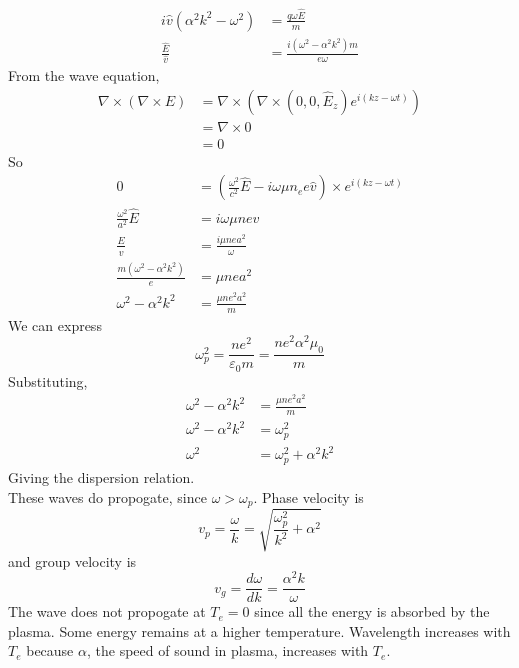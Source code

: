 \documentclass[answers]{exam}
\begin{document}
\begin{questions}
\begin{solution}
\begin{align*}
        i\hat v(\alpha^2k^2 - \omega^2) &= \frac{q\omega\hat E}{m} \\
        \frac{\hat E}{\hat v} &= \frac{i(\omega^2-\alpha^2k^2)m}{e\omega}
    \end{align*}
    From the wave equation,
    \begin{align*}
        \nabla \times (\nabla \times E) &= \nabla \times (\nabla \times (0, 0, \hat E_z) e^{i(kz-\omega t)}) \\
                                        &= \nabla \times 0 \\
                                        &= 0
    \end{align*}
    So
    \begin{align*}
        0 &= \left(\frac{\omega^2}{c^2} \hat E - i\omega \mu n_ee \hat v\right) \times e^{i(kz - \omega t)} \\
        \frac{\omega^2}{a^2} \hat E &= i\omega\mu ne\hat v \\
        \frac{\hat E}{\hat v} &= \frac{i\mu nea^2}{\omega} \\
        \frac{m(\omega^2-\alpha^2k^2)}{e} &= \mu nea^2 \\
        \omega^2 - \alpha^2k^2 &= \frac{\mu ne^2a^2}{m}
    \end{align*}
    We can express
    $$\omega_p^2 = \frac{ne^2}{\varepsilon_0m} = \frac{ne^2\alpha^2\mu_0}{m}$$
    Substituting,
    \begin{align*}
        \omega^2-\alpha^2k^2 &= \frac{\mu ne^2a^2}{m} \\
        \omega^2-\alpha^2k^2 &= \omega_p^2 \\
        \omega^2 &= \omega_p^2 + \alpha^2k^2
    \end{align*}
    Giving the dispersion relation. \\
    These waves do propogate, since $\omega > \omega_p$. Phase velocity is
    $$v_p = \frac{\omega}{k} = \sqrt{\frac{\omega_p^2}{k^2} + \alpha^2}$$
    and group velocity is
    $$v_g = \frac{d\omega}{dk} = \frac{\alpha^2k}{\omega}$$
    The wave does not propogate at $T_e = 0$ since all the energy is absorbed by the plasma. Some energy remains at a higher temperature. Wavelength increases with $T_e$ because $\alpha$, the speed of sound in plasma, increases with $T_e$.
\end{solution}



\end{questions}
\end{document}
